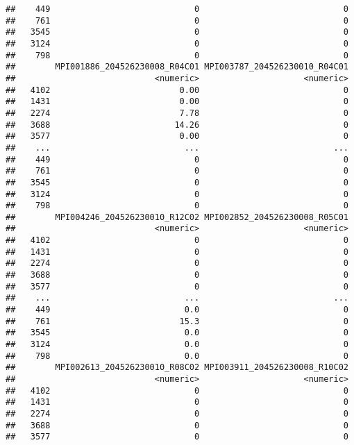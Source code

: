 \documentclass[
]{article}
\begin{document}
\begin{verbatim}
##    449                             0                             0
##    761                             0                             0
##   3545                             0                             0
##   3124                             0                             0
##    798                             0                             0
##        MPI001886_204526230008_R04C01 MPI003787_204526230010_R04C01
##                            <numeric>                     <numeric>
##   4102                          0.00                             0
##   1431                          0.00                             0
##   2274                          7.78                             0
##   3688                         14.26                             0
##   3577                          0.00                             0
##    ...                           ...                           ...
##    449                             0                             0
##    761                             0                             0
##   3545                             0                             0
##   3124                             0                             0
##    798                             0                             0
##        MPI004246_204526230010_R12C02 MPI002852_204526230008_R05C01
##                            <numeric>                     <numeric>
##   4102                             0                             0
##   1431                             0                             0
##   2274                             0                             0
##   3688                             0                             0
##   3577                             0                             0
##    ...                           ...                           ...
##    449                           0.0                             0
##    761                          15.3                             0
##   3545                           0.0                             0
##   3124                           0.0                             0
##    798                           0.0                             0
##        MPI002613_204526230010_R08C02 MPI003911_204526230008_R10C02
##                            <numeric>                     <numeric>
##   4102                             0                             0
##   1431                             0                             0
##   2274                             0                             0
##   3688                             0                             0
##   3577                             0                             0

\end{verbatim}
\end{document}
